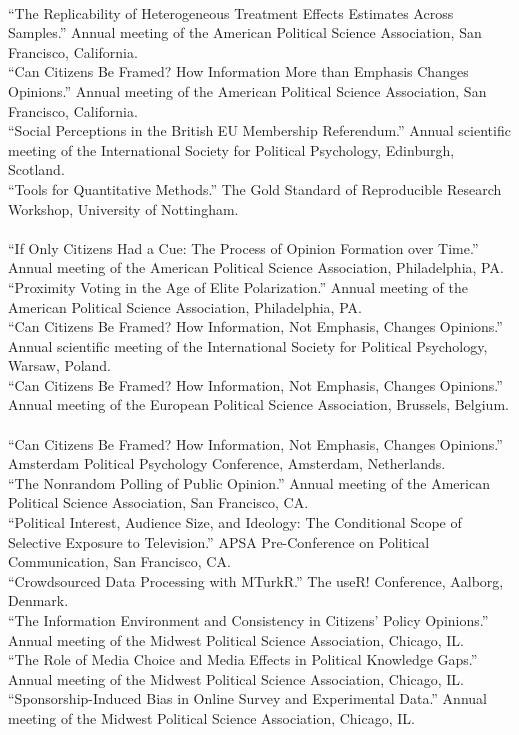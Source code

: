\documentclass[12pt]{article}
\newcommand{\topic}[1]{\pagebreak[3]\indent {\color{lg}{\footnotesize #1 }}\\}
\newcommand{\entry}[1]{\indent {\color{lg}\guillemotright}\hspace{2pt}#1\vspace{.25em}\\}
\begin{document}
	\topic{Conference Papers (2017)}
	\entry{``The Replicability of Heterogeneous Treatment Effects Estimates Across Samples.'' Annual meeting of the American Political Science Association, San Francisco, California.}
    \entry{``Can Citizens Be Framed? How Information More than Emphasis Changes Opinions.'' Annual meeting of the American Political Science Association, San Francisco, California.}
    \entry{``Social Perceptions in the British EU Membership Referendum.'' Annual scientific meeting of the International Society for Political Psychology, Edinburgh, Scotland.}
    \entry{``Tools for Quantitative Methods.'' The Gold Standard of Reproducible Research Workshop, University of Nottingham.}
	
    \topic{Conference Papers (2016)}
	\entry{``If Only Citizens Had a Cue: The Process of Opinion Formation over Time.'' Annual meeting of the American Political Science Association, Philadelphia, PA.}
	\entry{``Proximity Voting in the Age of Elite Polarization.'' Annual meeting of the American Political Science Association, Philadelphia, PA.}
	\entry{``Can Citizens Be Framed? How Information, Not Emphasis, Changes Opinions.'' Annual scientific meeting of the International Society for Political Psychology, Warsaw, Poland.}
	\entry{``Can Citizens Be Framed? How Information, Not Emphasis, Changes Opinions.'' Annual meeting of the European Political Science Association, Brussels, Belgium.}
	
	\topic{Conference Papers (2015)}
	\entry{``Can Citizens Be Framed? How Information, Not Emphasis, Changes Opinions.'' Amsterdam Political Psychology Conference, Amsterdam, Netherlands.}
	\entry{``The Nonrandom Polling of Public Opinion.'' Annual meeting of the American Political Science Association, San Francisco, CA.}
	\entry{``Political Interest, Audience Size, and Ideology: The Conditional Scope of Selective Exposure to Television.'' APSA Pre-Conference on Political Communication, San Francisco, CA.}
	\entry{``Crowdsourced Data Processing with MTurkR.'' The useR! Conference, Aalborg, Denmark.}
	\entry{``The Information Environment and Consistency in Citizens' Policy Opinions.'' Annual meeting of the Midwest Political Science Association, Chicago, IL.}
	\entry{``The Role of Media Choice and Media Effects in Political Knowledge Gaps.'' Annual meeting of the Midwest Political Science Association, Chicago, IL.}
	\entry{``Sponsorship-Induced Bias in Online Survey and Experimental Data.'' Annual meeting of the Midwest Political Science Association, Chicago, IL.}
	
\end{document}
